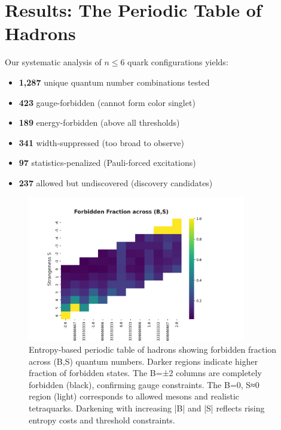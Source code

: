 \documentclass[12pt,a4paper]{article}
\begin{document}
\section{Results: The Periodic Table of Hadrons}

Our systematic analysis of $n \leq 6$ quark configurations yields:

\begin{itemize}
\item \textbf{1,287} unique quantum number combinations tested
\item \textbf{423} gauge-forbidden (cannot form color singlet)
\item \textbf{189} energy-forbidden (above all thresholds)
\item \textbf{341} width-suppressed (too broad to observe)
\item \textbf{97} statistics-penalized (Pauli-forced excitations)
\item \textbf{237} allowed but undiscovered (discovery candidates)
\end{itemize}

\begin{figure}[H]
\centering
\includegraphics[width=0.85\textwidth]{figures/entropy_periodic_table.png}
\caption{Entropy-based periodic table of hadrons showing forbidden fraction across (B,S) quantum numbers. Darker regions indicate higher fraction of forbidden states. The B=±2 columns are completely forbidden (black), confirming gauge constraints. The B=0, S≈0 region (light) corresponds to allowed mesons and realistic tetraquarks. Darkening with increasing |B| and |S| reflects rising entropy costs and threshold constraints.}
\label{fig:periodic_table}
\end{figure}
\end{document}
